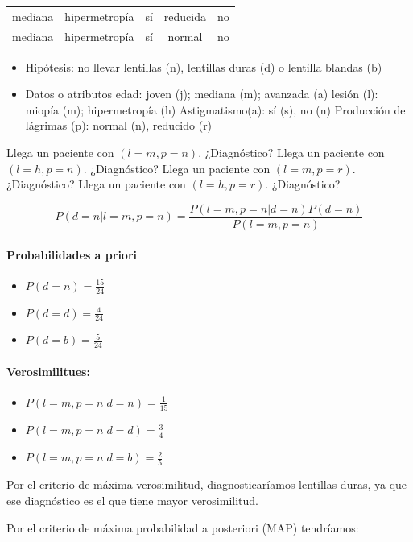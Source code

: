 \documentclass{apuntes}
\begin{document}
\begin{problem}[lentillas]
\begin{tabular}{c|c|c|c|c}
mediana & hipermetropía & sí & reducida & no \\
mediana & hipermetropía & sí & normal & no

\end{tabular}

\begin{itemize}
	\item Hipótesis: no llevar lentillas (n), lentillas duras (d) o lentilla blandas (b)
	\item Datos o atributos
	\subitem edad: joven (j); mediana (m); avanzada (a)
	\subitem lesión (l): miopía (m); hipermetropía (h)
	\subitem Astigmatismo(a): sí (s), no (n)
	\subitem Producción de lágrimas (p): normal (n), reducido (r)
\end{itemize}

\ppart Llega un paciente con $(l=m,p=n)$. ¿Diagnóstico?
\ppart Llega un paciente con $(l=h,p=n)$. ¿Diagnóstico?
\ppart Llega un paciente con $(l=m,p=r)$. ¿Diagnóstico?
\ppart Llega un paciente con $(l=h,p=r)$. ¿Diagnóstico?


\solution

\spart \[P(d=n | l=m, p=n ) = \frac{P(l=m, p=n | d=n) P(d=n)}{P(l=m, p=n)}\]

\paragraph{Probabilidades a priori}
\begin{itemize}
	\item $P(d=n) = \frac{15}{24}$
	\item $P(d=d) = \frac{4}{24}$
	\item $P(d=b) = \frac{5}{24}$
\end{itemize}
\paragraph{Verosimilitues:}
\begin{itemize}
	\item $P(l=m,p=n | d = n) = \frac{1}{15}$
	\item $P(l=m,p=n | d=d) = \frac{3}{4}$
	\item $P(l=m,p=n | d=b) = \frac{2}{5}$
\end{itemize}

Por el criterio de máxima verosimilitud, diagnosticaríamos lentillas duras, ya que ese diagnóstico es el que tiene mayor verosimilitud.

Por el criterio de máxima probabilidad a posteriori (MAP) tendríamos:


\end{problem}
\end{document}
